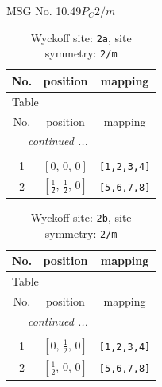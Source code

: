 \documentclass[fleqn,8pt]{jsarticle}
\begin{document}
\setcounter{MaxMatrixCols}{32}

\renewcommand{\tablename}{Table~}
\renewcommand{\figurename}{Figure~}
\begin{center}
\LARGE
MSG No. 10.49\quad$P_{C}2/m$
\end{center}
\renewcommand{\arraystretch}{1.2}
\begin{longtable}{ccc}
\caption{Wyckoff site: {\tt 2a}, site symmetry: {\tt 2/m}}
 \\
 \hline \hline
No. & position & mapping \\ \hline \endfirsthead

\multicolumn{2}{l}{\tablename\ \thetable{}} \\
 \hline \hline
No. & position & mapping \\ \hline \endhead

 \hline \hline
\multicolumn{2}{r}{\footnotesize\it continued ...} \\ \endfoot

 \hline \hline
\multicolumn{2}{r}{} \\ \endlastfoot

1 & $\left[ 0,\, 0,\, 0 \right]$ & {\tt [1,2,3,4]} \\ \hline
2 & $\left[ \frac{1}{2},\, \frac{1}{2},\, 0 \right]$ & {\tt [5,6,7,8]} \\
\end{longtable}
\renewcommand{\arraystretch}{1.2}
\begin{longtable}{ccc}
\caption{Wyckoff site: {\tt 2b}, site symmetry: {\tt 2/m}}
 \\
 \hline \hline
No. & position & mapping \\ \hline \endfirsthead

\multicolumn{2}{l}{\tablename\ \thetable{}} \\
 \hline \hline
No. & position & mapping \\ \hline \endhead

 \hline \hline
\multicolumn{2}{r}{\footnotesize\it continued ...} \\ \endfoot

 \hline \hline
\multicolumn{2}{r}{} \\ \endlastfoot

1 & $\left[ 0,\, \frac{1}{2},\, 0 \right]$ & {\tt [1,2,3,4]} \\ \hline
2 & $\left[ \frac{1}{2},\, 0,\, 0 \right]$ & {\tt [5,6,7,8]} \\
\end{longtable}
\renewcommand{\arraystretch}{1.2}
\end{document}
